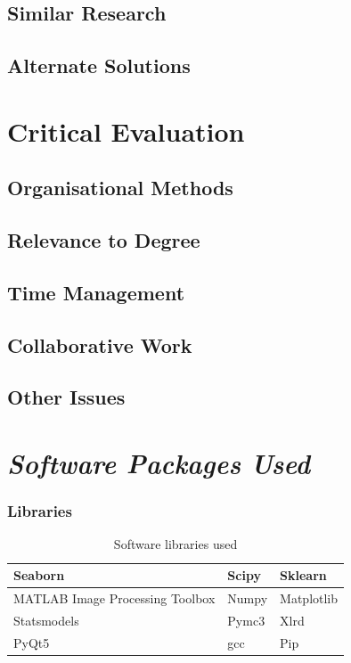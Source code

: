 \documentclass[11pt]{report}
\begin{document}
\section{Similar Research}
\label{sec:org21919a8}
\section{Alternate Solutions}
\label{sec:orgad16101}
\chapter{Critical Evaluation}
\label{sec:orgee6fd19}
\section{Organisational Methods}
\label{sec:orga29bf9c}
\section{Relevance to Degree}
\label{sec:org9a12f27}
\section{Time Management}
\label{sec:org339e651}
\section{Collaborative Work}
\label{sec:org2327cc7}
\section{Other Issues}
\label{sec:org3115cd6}


\appendix
\chapter{\emph{Software Packages Used}}
\label{sec:org3db1b5a}
\subsection{Libraries}
\label{sec:orgd9cf05b}
\begin{table}[htbp]
\caption{\label{tab:org95d00bd}
Software libraries used}
\centering
\begin{tabularx}{\textwidth}{|X|X|X|}
\hline
Seaborn & Scipy & Sklearn\\
\hline
MATLAB Image Processing Toolbox & Numpy & Matplotlib\\
\hline
Statsmodels & Pymc3 & Xlrd\\
\hline
PyQt5 & gcc & Pip\\
\hline
\end{tabularx}
\end{table}
\end{document}
